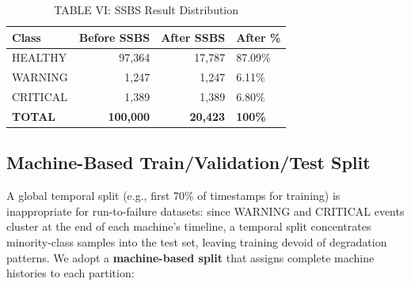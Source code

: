 \documentclass[conference]{IEEEtran}
\begin{document}
\begin{table}[htbp]
\caption{TABLE VI: SSBS Result Distribution}
\centering
\begin{tabular}{lrrl}
\hline
\textbf{Class} & \textbf{Before SSBS} & \textbf{After SSBS} & \textbf{After \%} \\
\hline
HEALTHY & 97,364 & 17,787 & 87.09\% \\
WARNING & 1,247 & 1,247 & 6.11\% \\
CRITICAL & 1,389 & 1,389 & 6.80\% \\
\hline
\textbf{TOTAL} & \textbf{100,000} & \textbf{20,423} & \textbf{100\%} \\
\hline
\end{tabular}
\label{tab:ssbs}
\end{table}


\subsection{Machine-Based Train/Validation/Test Split}

A global temporal split (e.g., first 70\% of timestamps for training) is inappropriate for run-to-failure datasets: since WARNING and CRITICAL events cluster at the end of each machine's timeline, a temporal split concentrates minority-class samples into the test set, leaving training devoid of degradation patterns. We adopt a \textbf{machine-based split} that assigns complete machine histories to each partition:
\end{document}
